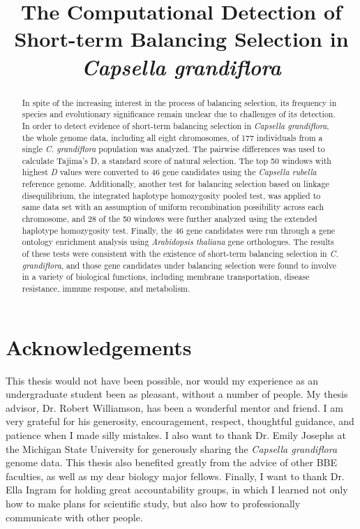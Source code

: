 \title{The Computational Detection of Short-term Balancing Selection in \emph{Capsella grandiflora}}
\subtitle{}
\maketitle
\abstractpreamble

\begin{abstract}

In spite of the increasing interest in the process of balancing selection, its frequency in species and evolutionary significance remain unclear due to challenges of its detection. In order to detect evidence of short-term balancing selection in \emph{Capsella grandiflora}, the whole genome data, including all eight chromosomes, of 177 individuals from a single \emph{C. grandiflora} population was analyzed. The pairwise differences was used to calculate Tajima’s D, a standard score of natural selection. The top 50 windows with highest \emph{D} values were converted to 46 gene candidates using the \emph{Capsella rubella} reference genome. Additionally, another test for balancing selection based on linkage disequilibrium, the integrated haplotype homozygosity pooled test, was applied to same data set with an assumption of uniform recombination possibility across each chromosome, and 28 of the 50 windows were further analyzed using the extended haplotype homozygosity test. Finally, the 46 gene candidates were run through a gene ontology enrichment analysis using \emph{Arabidopsis thaliana} gene orthologues. The results of these tests were consistent with the existence of short-term balancing selection in \emph{C. grandiflora}, and those gene candidates under balancing selection were found to involve in a variety of biological functions, including membrane transportation, disease resistance, immune response, and metabolism.
\end{abstract}

\newpage
\section{Acknowledgements}
This thesis would not have been possible, nor would my experience as an undergraduate student been as pleasant, without a number of people. My thesis advisor, Dr. Robert Williamson, has been a wonderful mentor and friend. I am very grateful for his generosity, encouragement, respect, thoughtful guidance, and patience when I made silly mistakes. I also want to thank Dr. Emily Josephs at the Michigan State University for generously sharing the \emph{Capsella grandiflora} genome data. This thesis also benefited greatly from the advice of other BBE faculties, as well as my dear biology major fellows. Finally, I want to thank Dr. Ella Ingram for holding great accountability groups, in which I learned not only how to make plans for scientific study, but also how to professionally communicate with other people.

